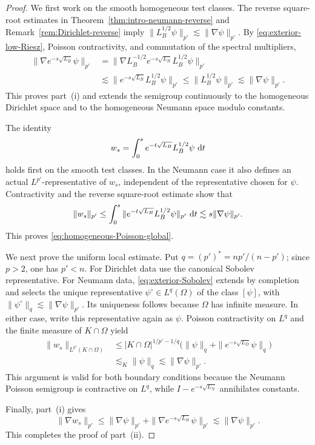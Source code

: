 \documentclass[12pt]{amsart}
\newcommand\dd{\,{\rm d}}
\theoremstyle{remark}
\begin{document}
\begin{proof}
We first work on the smooth homogeneous test classes.  The reverse
square-root estimates in Theorem~\ref{thm:intro-neumann-reverse} and
Remark~\ref{rem:Dirichlet-reverse} imply $\|L_B^{1/2}\psi\|_{p'}
 \lesssim\|\nabla\psi\|_{p'}$. By \eqref{eq:exterior-low-Riesz}, Poisson contractivity, and commutation
of the spectral multipliers,
\begin{align*}
 \|\nabla e^{-s\sqrt{L_B}}\psi\|_{p'}
 &=\|\nabla L_B^{-1/2}e^{-s\sqrt{L_B}}L_B^{1/2}\psi\|_{p'}\\
 &\lesssim\|e^{-s\sqrt{L_B}}L_B^{1/2}\psi\|_{p'}
 \leq\|L_B^{1/2}\psi\|_{p'}
 \lesssim\|\nabla\psi\|_{p'}.
\end{align*}
This proves part~\textup{(i)} and extends the semigroup continuously to
the homogeneous Dirichlet space and to the homogeneous Neumann space
modulo constants.

The identity
\[
 w_s=\int_0^s e^{-t\sqrt{L_B}}L_B^{1/2}\psi\,\dd t
\]
holds first on the smooth test classes.  In the Neumann case it also
defines an actual \(L^{p'}\)-representative of \(w_s\), independent of
the representative chosen for \(\psi\).  Contractivity and the reverse
square-root estimate show that
\[
 \|w_s\|_{p'}
 \leq\int_0^s\|e^{-t\sqrt{L_B}}L_B^{1/2}\psi\|_{p'}\,\dd t
 \lesssim s\|\nabla\psi\|_{p'}.
\]
This proves \eqref{eq:homogeneous-Poisson-global}.

We next prove the uniform local estimate.  Put
\(q=(p')^*=np'/(n-p')\); since \(p>2\), one has \(p'<n\).
For Dirichlet data use the canonical Sobolev representative.  For
Neumann data, \eqref{eq:exterior-Sobolev} extends by completion and
selects the unique representative \(\psi^\circ\in L^q(\Omega)\) of the
class \([\psi]\), with
\(\|\psi^\circ\|_q\lesssim\|\nabla\psi\|_{p'}\).  Its uniqueness follows
because \(\Omega\) has infinite measure.  In either case, write this
representative again as \(\psi\).  Poisson contractivity on \(L^q\) and
the finite measure of \(K\cap\Omega\) yield
\begin{align*}
 \|w_s\|_{L^{p'}(K\cap\Omega)}
 &\leq |K\cap\Omega|^{1/p'-1/q}
 \bigl(\|\psi\|_q+\|e^{-s\sqrt{L_D}}\psi\|_q\bigr)\\
 &\lesssim_K\|\psi\|_q
 \lesssim\|\nabla\psi\|_{p'}.
\end{align*}
This argument is valid for both boundary conditions because the Neumann
Poisson semigroup is contractive on \(L^q\), while
\(I-e^{-s\sqrt{L_N}}\) annihilates constants.  

Finally, part~\textup{(i)} gives
\[
 \|\nabla w_s\|_{p'}
 \leq\|\nabla\psi\|_{p'}
     +\|\nabla e^{-s\sqrt{L_B}}\psi\|_{p'}
 \lesssim\|\nabla\psi\|_{p'}.
\]
This completes the proof of part~\textup{(ii)}.


\end{proof}
\end{document}
